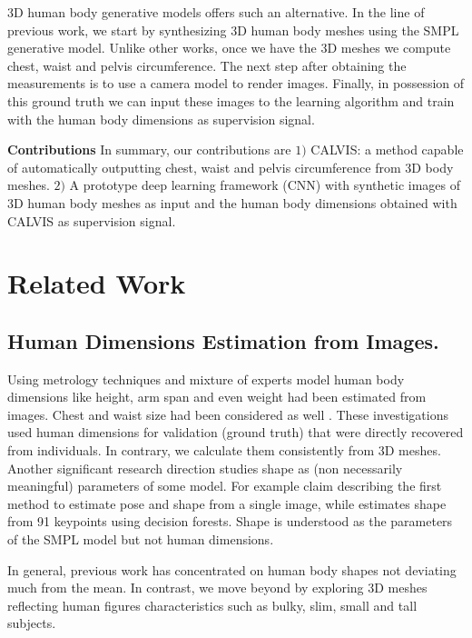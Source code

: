 \documentclass[runningheads, orivec]{llncs}
\begin{document}
3D human body generative models offers such an alternative. In the line of previous work, we start by synthesizing 3D human body meshes using the SMPL \cite{Loper.2015} generative 
model. Unlike other works, once we have 
the 3D meshes we compute chest, waist and pelvis circumference. The next 
step after obtaining the 
measurements is to use a camera model to render
images. Finally, in possession of this ground truth we can 
input these images to the learning algorithm and train with the human body dimensions as supervision signal.

\textbf{Contributions} In summary, our contributions are $1)$ CALVIS: a method 
capable of automatically outputting chest, waist and pelvis circumference from 
3D body meshes. $2)$ A prototype deep learning framework (CNN) with synthetic 
images of 3D human body meshes as input and the human body dimensions obtained 
with CALVIS as supervision signal.

\section{Related Work} \label{sec:related_work}

\subsection{Human Dimensions Estimation from Images.}
Using metrology techniques \cite{ams.2008.BenAbdelkaderY08} and mixture of experts model \cite{Sigal.2008} human body dimensions like height, arm span and even weight had been estimated from images. Chest and waist size had been considered as well \cite{Guan.2013}. These investigations used human dimensions for validation (ground truth) that were directly recovered from individuals. In contrary, we calculate them  
consistently from 3D meshes.
Another significant research direction studies shape as (non necessarily meaningful) parameters of some model. For example \cite{Bogo:ECCV:2016} claim describing the first method 
to 
estimate pose and shape from a single image, while \cite{DBLP:Lassner2017} estimates shape from 91 keypoints using decision 
forests. Shape is understood as the 
parameters of the SMPL model but not human dimensions.

In general, previous work has concentrated on human body shapes not deviating 
much from the mean. In contrast, we move beyond by exploring 3D meshes 
reflecting human figures characteristics such as bulky, slim, small and 
tall subjects.
\end{document}
